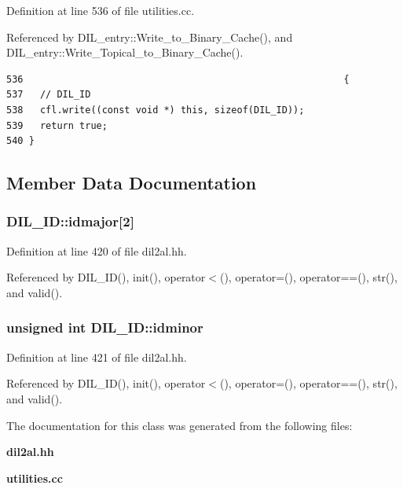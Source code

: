 Definition at line 536 of file utilities.cc.

Referenced by DIL\_\-entry::Write\_\-to\_\-Binary\_\-Cache(), and DIL\_\-entry::Write\_\-Topical\_\-to\_\-Binary\_\-Cache().



\footnotesize\begin{verbatim}536                                                         {
537   // DIL_ID
538   cfl.write((const void *) this, sizeof(DIL_ID));
539   return true;
540 }
\end{verbatim}\normalsize 


\subsection{Member Data Documentation}
\subsubsection{ DIL\_\-ID::idmajor[2]}\label{classDIL__ID_m0}




Definition at line 420 of file dil2al.hh.

Referenced by DIL\_\-ID(), init(), operator$<$(), operator=(), operator==(), str(), and valid().
\subsubsection{\setlength{\rightskip}{0pt plus 5cm}unsigned int DIL\_\-ID::idminor}\label{classDIL__ID_m1}




Definition at line 421 of file dil2al.hh.

Referenced by DIL\_\-ID(), init(), operator$<$(), operator=(), operator==(), str(), and valid().

The documentation for this class was generated from the following files:\begin{CompactItemize}
\item 
{\bf dil2al.hh}\item 
{\bf utilities.cc}\end{CompactItemize}
